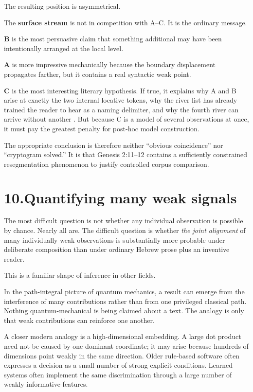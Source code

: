 The resulting position is asymmetrical.

The \textbf{surface stream} is not in competition with A--C.  It is the ordinary message.

\textbf{B} is the most persuasive claim that something additional may have been intentionally arranged at the local level.

\textbf{A} is more impressive mechanically because the boundary displacement propagates farther, but it contains a real syntactic weak point.

\textbf{C} is the most interesting literary hypothesis.  If true, it explains why A and B arise at exactly the two internal locative  tokens, why the river list has already trained the reader to hear  as a naming delimiter, and why the fourth river can arrive without another .  But because C is a model of several observations at once, it must pay the greatest penalty for post-hoc model construction.

The appropriate conclusion is therefore neither ``obvious coincidence'' nor ``cryptogram solved.''  It is that Genesis 2:11--12 contains a sufficiently constrained resegmentation phenomenon to justify controlled corpus comparison.

\section*{10.\quad Quantifying many weak signals}

The most difficult question is not whether any individual observation is possible by chance.  Nearly all are.  The difficult question is whether \emph{the joint alignment} of many individually weak observations is substantially more probable under deliberate composition than under ordinary Hebrew prose plus an inventive reader.

This is a familiar shape of inference in other fields.

In the path-integral picture of quantum mechanics, a result can emerge from the interference of many contributions rather than from one privileged classical path.\cite{FeynmanHibbs1965}  Nothing quantum-mechanical is being claimed about a text.  The analogy is only that weak contributions can reinforce one another.

A closer modern analogy is a high-dimensional embedding.  A large dot product need not be caused by one dominant coordinate; it may arise because hundreds of dimensions point weakly in the same direction.  Older rule-based software often expresses a decision as a small number of strong explicit conditions.  Learned systems often implement the same discrimination through a large number of weakly informative features.

